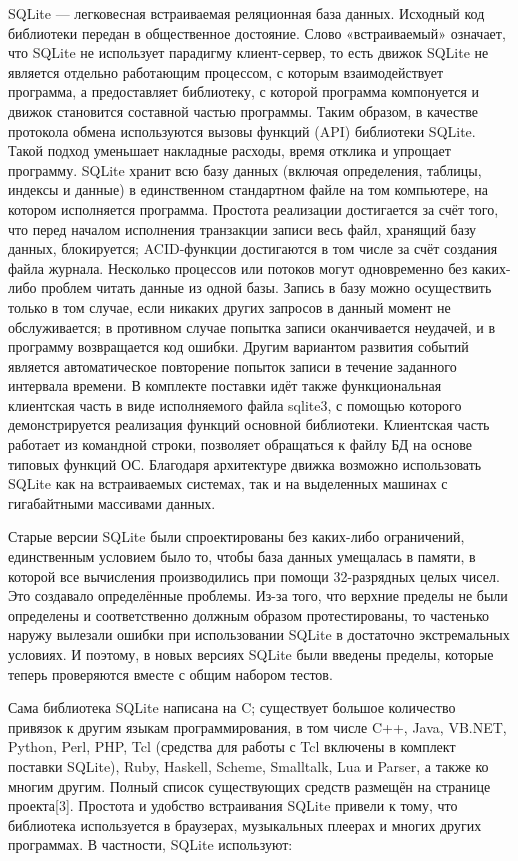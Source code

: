 SQLite — легковесная встраиваемая реляционная база данных. Исходный код библиотеки передан в общественное достояние.
Слово «встраиваемый» означает, что SQLite не использует парадигму клиент-сервер, то есть движок SQLite не является отдельно
работающим процессом, с которым взаимодействует программа, а предоставляет библиотеку, с которой программа компонуется и движок 
становится составной частью программы. Таким образом, в качестве протокола обмена используются вызовы функций (API) библиотеки
SQLite. Такой подход уменьшает накладные расходы, время отклика и упрощает программу. SQLite хранит всю базу данных 
(включая определения, таблицы, индексы и данные) в единственном стандартном файле на том компьютере, на котором исполняется
программа. Простота реализации достигается за счёт того, что перед началом исполнения транзакции записи весь файл, хранящий 
базу данных, блокируется; ACID-функции достигаются в том числе за счёт создания файла журнала.
Несколько процессов или потоков могут одновременно без каких-либо проблем читать данные из одной базы. 
Запись в базу можно осуществить только в том случае, если никаких других запросов в данный момент не обслуживается; 
в противном случае попытка записи оканчивается неудачей, и в программу возвращается код ошибки. 
Другим вариантом развития событий является автоматическое повторение попыток записи в течение заданного интервала времени.
В комплекте поставки идёт также функциональная клиентская часть в виде исполняемого файла sqlite3, с помощью которого
демонстрируется реализация функций основной библиотеки. Клиентская часть работает из командной строки, позволяет обращаться
к файлу БД на основе типовых функций ОС.
Благодаря архитектуре движка возможно использовать SQLite как на встраиваемых системах, так и на выделенных машинах
с гигабайтными массивами данных.

Старые версии SQLite были спроектированы без каких-либо ограничений, единственным условием было то, чтобы база данных
умещалась в памяти, в которой все вычисления производились при помощи 32-разрядных целых чисел. Это создавало определённые проблемы.
Из-за того, что верхние пределы не были определены и соответственно
должным образом протестированы, то частенько наружу вылезали ошибки при использовании SQLite в достаточно экстремальных условиях.
И поэтому, в новых версиях SQLite были введены пределы, которые теперь проверяются вместе с общим набором тестов.

Сама библиотека SQLite написана на C; существует большое количество привязок к другим языкам программирования, в том числе C++, Java, VB.NET, Python, Perl, PHP, Tcl (средства для работы с Tcl включены в комплект поставки SQLite), Ruby, Haskell, Scheme, Smalltalk, Lua и Parser, а также ко многим другим. Полный список существующих средств размещён на странице проекта[3].
Простота и удобство встраивания SQLite привели к тому, что библиотека используется в браузерах, музыкальных плеерах и многих других программах.
В частности, SQLite используют:

